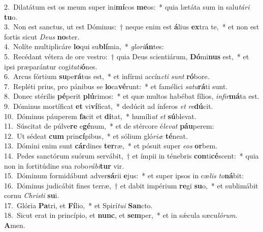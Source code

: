 {2.~}Dilatátum est os meum super ini\textbf{mí}cos \textbf{me}os:~* quia lætáta sum in salu\textit{tá}\textit{ri} \textbf{tu}o.\\
{3.~}Non est sanctus, ut est Dóminus:~† neque enim est \textbf{á}lius \textbf{ex}tra te,~* et non est fortis sicut \textit{De}\textit{us} \textbf{no}ster.\\
{4.~}Nolíte multiplicáre \textbf{lo}qui su\textbf{blí}mia,~* \textit{glo}\textit{ri}\textbf{án}tes:\\
{5.~}Recédant vétera de ore vestro:~† quia Deus scientiárum, \textbf{Dó}mi\textbf{nus} est,~* et ipsi præparántur cogi\textit{ta}\textit{ti}\textbf{ó}nes.\\
{6.~}Arcus fórtium \textbf{su}pe\textbf{rá}tus est,~* et infírmi accín\textit{cti} \textit{sunt} \textbf{ró}bore.\\
{7.~}Repléti prius, pro pánibus se \textbf{lo}ca\textbf{vé}runt:~* et famélici \textit{sa}\textit{tu}\textbf{rá}ti sunt.\\
{8.~}Donec stérilis \textbf{pé}perit \textbf{plú}rimos:~* et quæ multos habébat fílios, \textit{in}\textit{fir}\textbf{má}ta est.\\
{9.~}Dóminus mortíficat \textbf{et} vi\textbf{ví}ficat,~* dedúcit ad ínferos \textit{et} \textit{re}\textbf{dú}cit.\\
{10.~}Dóminus páuperem \textbf{fa}cit et \textbf{di}tat,~* humíli\textit{at} \textit{et} \textbf{sú}blevat.\\
{11.~}Súscitat de púlve\textbf{re} e\textbf{gé}num,~* et de stércore é\textit{le}\textit{vat} \textbf{páu}perem:\\
{12.~}Ut sédeat \textbf{cum} prin\textbf{cí}pibus,~* et sólium gló\textit{ri}\textit{æ} \textbf{té}neat.\\
{13.~}Dómini enim sunt \textbf{cár}dines \textbf{ter}ræ,~* et pósuit super \textit{e}\textit{os} \textbf{or}bem.\\
{14.~}Pedes sanctórum suórum servábit,~† et ímpii in ténebris \textbf{con}ti\textbf{cé}scent:~* quia non in fortitúdine sua robo\textit{rá}\textit{bi}\textbf{tur} vir.\\
{15.~}Dóminum formidábunt adver\textbf{sá}rii \textbf{e}jus:~* et super ipsos in cæ\textit{lis} \textit{to}\textbf{ná}bit:\\
{16.~}Dóminus judicábit fines terræ,~† et dabit impérium \textbf{re}gi \textbf{su}o,~* et sublimábit cornu \textit{Chri}\textit{sti} \textbf{su}i.\\
{17.~}Glória \textbf{Pa}tri, et \textbf{Fí}lio,~* et Spirí\textit{tu}\textit{i} \textbf{San}cto.\\
{18.~}Sicut erat in princípio, et \textbf{nunc}, et \textbf{sem}per,~* et in sǽcula sæcu\textit{ló}\textit{rum}. \textbf{A}men.\\
